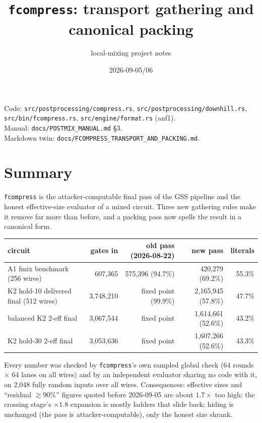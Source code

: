 \documentclass[11pt]{article}
\title{\texttt{fcompress}: transport gathering and canonical packing}
\author{local-mixing project notes}
\date{2026-09-05/06}
\begin{document}
\maketitle

\noindent Code: \texttt{src/postprocessing/compress.rs}, \texttt{src/postprocessing/downhill.rs},\\
\texttt{src/bin/fcompress.rs}, \texttt{src/engine/format.rs} (anf1).\\
Manual: \texttt{docs/POSTMIX\_MANUAL.md} \S3.\\
Markdown twin: \texttt{docs/FCOMPRESS\_TRANSPORT\_AND\_PACKING.md}.

\section{Summary}

\texttt{fcompress} is the attacker-computable final pass of the GSS pipeline and the honest
effective-size evaluator of a mixed circuit. Three new gathering rules make it remove far more
than before, and a packing pass now spells the result in a canonical form.

\begin{center}\small
\begin{tabular}{lrrrr}\toprule
circuit & gates in & old pass (2026-08-22) & new pass & literals\\\midrule
A1 fmix benchmark (256 wires) & 607,365 & 575,396 (94.7\%) & 420,279 (69.2\%) & 55.3\%\\
K2 hold-10 delivered final (512 wires) & 3,748,210 & fixed point (99.9\%) & 2,165,945 (57.8\%) & 47.7\%\\
balanced K2 2-eff final & 3,067,544 & fixed point & 1,614,661 (52.6\%) & 43.2\%\\
K2 hold-30 2-eff final & 3,053,636 & fixed point & 1,607,266 (52.6\%) & 43.3\%\\
\bottomrule\end{tabular}
\end{center}

Every number was checked by \texttt{fcompress}'s own sampled global check (64 rounds $\times$ 64
lanes on all wires) and by an independent evaluator sharing no code with it, on 2,048 fully
random inputs over all wires. Consequences: effective sizes and ``residual $\gtrsim 90\%$''
figures quoted before 2026-09-05 are about $1.7\times$ too high; the crossing stage's
$\times 1.8$ expansion is mostly ladders that slide back; hiding is unchanged (the pass is
attacker-computable), only the honest size shrank.
\end{document}
